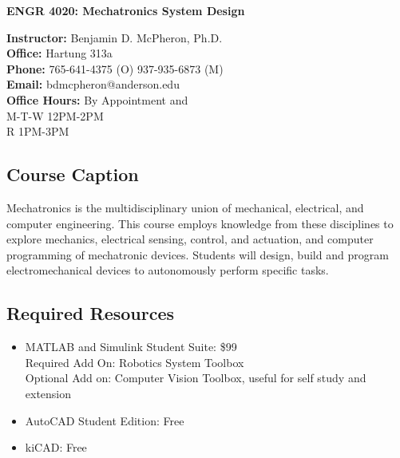\documentclass[12pt,letterpaper,onecolumn]{report}
\begin{document}
\begin{center}
\LARGE{\textbf{ENGR 4020: Mechatronics System Design}}\\
\end{center}

\begin{center}
\textbf{Instructor:} Benjamin D. McPheron, Ph.D.\\
\textbf{Office:} Hartung 313a\\
\textbf{Phone:} 765-641-4375 (O) 937-935-6873 (M)\\
\textbf{Email:} bdmcpheron@anderson.edu\\
\textbf{Office Hours:} 
By Appointment and \\M-T-W 12PM-2PM \\R 1PM-3PM\end{center}

\subsection*{Course Caption}
Mechatronics is the multidisciplinary union of mechanical, electrical, and computer engineering.  This course employs knowledge from these disciplines to explore mechanics, electrical sensing, control, and actuation, and computer programming of mechatronic devices.  Students will design, build and program electromechanical devices to autonomously perform specific tasks.

\subsection*{Required Resources}
\begin{itemize}
\item {MATLAB and Simulink Student Suite: \$99\\Required Add On: Robotics System Toolbox \\Optional Add on: Computer Vision Toolbox, useful for self study and extension}\item{AutoCAD Student Edition: Free}
\item{kiCAD: Free}
\end{itemize}
\end{document}
